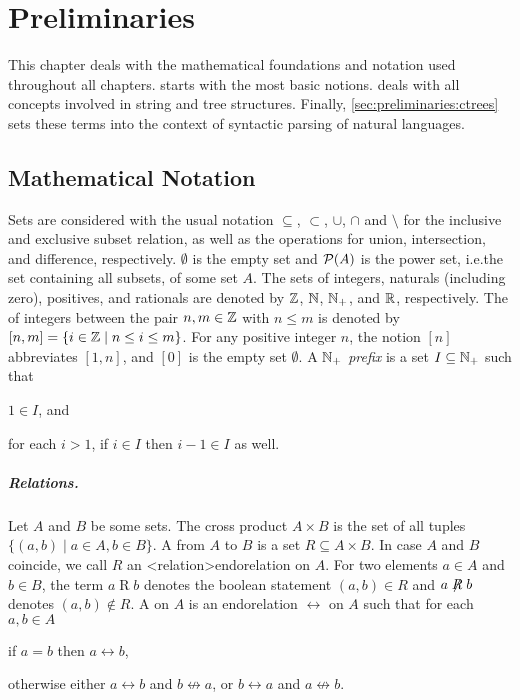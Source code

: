 \documentclass[../document.tex]{subfiles}
\begin{document}
    \chapter{Preliminaries}\label{sec:preliminaries}
    This chapter deals with the mathematical foundations and notation used throughout all chapters.
     starts with the most basic notions.
     deals with all concepts involved in string and tree structures.
    Finally, \cref{sec:preliminaries:ctrees} sets these terms into the context of syntactic parsing of natural languages.


    \section{Mathematical Notation}\label{sec:preliminaries:math}
    Sets are considered with the usual notation \(\subseteq\), \(\subset\), \(\cup\), \(\cap\) and \(\setminus\) for the inclusive and exclusive subset relation, as well as the operations for union, intersection, and difference, respectively.
    \(\emptyset\) is the empty set and \(\mathcal{P}(A)\) is the power set, i.e.\@ the set containing all subsets, of some set \(A\).
    The sets of integers, naturals (including zero), positives, and rationals are denoted by $\mathbb{Z}$, $\mathbb{N}$, $\mathbb{N}_+$, and $\mathbb{R}$, respectively.
    The  of integers between the pair \(n, m \in \mathbb{Z}\) with \(n \leq m\) is denoted by \([n,m] = \{i \in \mathbb{Z} \mid n \leq i \leq m\}\).
    For any positive integer \(n\), the notion \([n]\) abbreviates \([1,n]\), and \([0]\) is the empty set \(\emptyset\).
    A \emph{\(\mathbb{N}_+\) prefix} is a set \(I \subseteq \mathbb{N}_+\) such that
    \begin{inparaitem}[]
        \item \(1 \in I\), and
        \item for each \(i > 1\), if \(i \in I\) then \(i-1 \in I\) as well.
    \end{inparaitem}

    \paragraph{Relations.}
    Let \(A\) and \(B\) be some sets.
    The cross product \(A \times B\) is the set of all tuples \(\{(a,b) \mid a \in A, b\in B\}\).
    A  from \(A\) to \(B\) is a set \(R \subseteq A \times B\).
    In case \(A\) and \(B\) coincide, we call \(R\) an <relation>{endorelation} on \(A\).
    For two elements \(a \in A\) and \(b \in B\), the term \(a \mathrel{R} b\) denotes the boolean statement \((a,b) \in R\) and \(a \not\mathrel{R} b\) denotes \((a,b) \notin R\).
    A  on \(A\) is an endorelation \(\rel\) on \(A\) such that for each \(a, b \in A\)
    \begin{inparaenum}
        \item if \(a = b\) then \(a \rel b\),
        \item otherwise either \(a \rel b\) and \(b \not\rel a\), or \(b \rel a\) and \(a \not\rel b\).
    \end{inparaenum}
\end{document}
